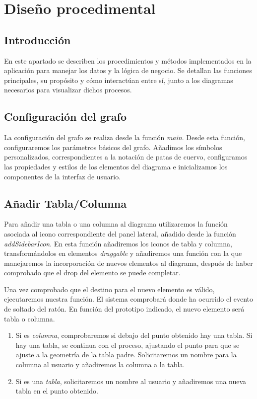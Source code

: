 
\section{Diseño procedimental}

\subsection{Introducción}

En este apartado se describen los procedimientos y métodos implementados en la aplicación para manejar los datos y la lógica de negocio. Se detallan las funciones principales, su propósito y cómo interactúan entre sí, junto a los diagramas necesarios para visualizar dichos procesos.

\subsection{Configuración del grafo}

La configuración del grafo se realiza desde la función \emph{main}. Desde esta función, configuraremos los parámetros básicos del grafo. Añadimos los símbolos personalizados, correspondientes a la notación de patas de cuervo, configuramos las propiedades y estilos de los elementos del diagrama e inicializamos los componentes de la interfaz de usuario.

\subsection{Añadir Tabla/Columna}

Para añadir una tabla o una columna al diagrama utilizaremos la función asociada al icono correspondiente del panel lateral, añadido desde la función \emph{addSidebarIcon}. En esta función añadiremos los iconos de tabla y columna, transformándolos en elementos \textit{draggable} y añadiremos una función con la que manejaremos la incorporación de nuevos elementos al diagrama, después de haber comprobado que el drop del elemento se puede completar.

Una vez comprobado que el destino para el nuevo elemento es válido, ejecutaremos nuestra función. El sistema comprobará donde ha ocurrido el evento de soltado del ratón. En función del prototipo indicado, el nuevo elemento será tabla o columna.
\begin{enumerate}
    \item Si es \emph{columna}, comprobaremos si debajo del punto obtenido hay una tabla. Si hay una tabla, se continua con el proceso, ajustando el punto para que se ajuste a la geometría de la tabla padre. Solicitaremos un nombre para la columna al usuario y añadiremos la columna a la tabla.
    \item Si es una \emph{tabla}, solicitaremos un nombre al usuario y añadiremos una nueva tabla en el punto obtenido.
\end{enumerate}

